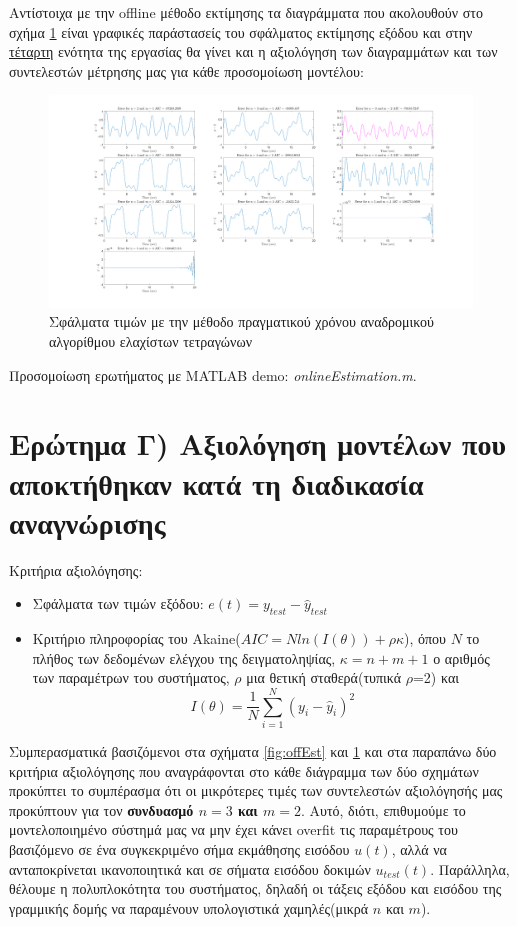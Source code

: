 \documentclass{article}
\begin{document}
\par Αντίστοιχα με την offline μέθοδο εκτίμησης τα διαγράμματα που ακολουθούν στο σχήμα \ref{fig:onlEst} είναι γραφικές παράστασείς του σφάλματος εκτίμησης εξόδου και στην \hyperref[sec:validation]{τέταρτη} ενότητα της εργασίας θα γίνει και η αξιολόγηση των διαγραμμάτων και των συντελεστών μέτρησης μας για κάθε προσομοίωση μοντέλου:
\begin{figure}[!htb]
    \centering
    \includegraphics[width=1.1\textwidth]{onlineEstimation.png}
    \caption{\label{fig:onlEst}Σφάλματα τιμών με την μέθοδο πραγματικού χρόνου αναδρομικού αλγορίθμου ελαχίστων τετραγώνων}
    \end{figure}

Προσομοίωση ερωτήματος με MATLAB demo: \textit{onlineEstimation.m}.

\section{Ερώτημα Γ) Αξιολόγηση μοντέλων που αποκτήθηκαν κατά τη διαδικασία αναγνώρισης}
\label{sec:validation}
Κριτήρια αξιολόγησης: 
\begin{itemize}
    \item Σφάλματα των τιμών εξόδου: $e(t) = y_{test} - \hat{y}_{test}$
    \item Κριτήριο πληροφορίας του Akaine($AIC = Nln (I(θ)) + \rho\kappa$), όπου $Ν$ το πλήθος των δεδομένων ελέγχου της δειγματοληψίας, $\kappa = n+m+1$ ο αριθμός των παραμέτρων του συστήματος, $\rho$ μια θετική σταθερά(τυπικά $\rho$=2) και
\begin{equation*}
I(θ)=\frac{1}{N} \sum_{i=1}^{N} \left(y_i-\hat{y}_i \right)^{2}
\end{equation*}
\end{itemize}
Συμπερασματικά βασιζόμενοι στα σχήματα \ref{fig:offEst} και \ref{fig:onlEst} και στα παραπάνω δύο κριτήρια αξιολόγησης που αναγράφονται στο κάθε διάγραμμα των δύο σχημάτων προκύπτει το συμπέρασμα ότι οι μικρότερες τιμές των συντελεστών αξιολόγησής μας προκύπτουν για τον \textbf{συνδυασμό $n = 3$ και $m = 2$}. Αυτό, διότι, επιθυμούμε το μοντελοποιημένο σύστημά μας να μην έχει κάνει overfit τις παραμέτρους του βασιζόμενο σε ένα συγκεκριμένο σήμα εκμάθησης εισόδου $u(t)$, αλλά να ανταποκρίνεται ικανοποιητικά και σε σήματα εισόδου δοκιμών $u_{test}(t)$. Παράλληλα, θέλουμε η πολυπλοκότητα του συστήματος, δηλαδή οι τάξεις εξόδου και εισόδου της γραμμικής δομής να παραμένουν υπολογιστικά χαμηλές(μικρά $n$ και $m$).
\end{document}
